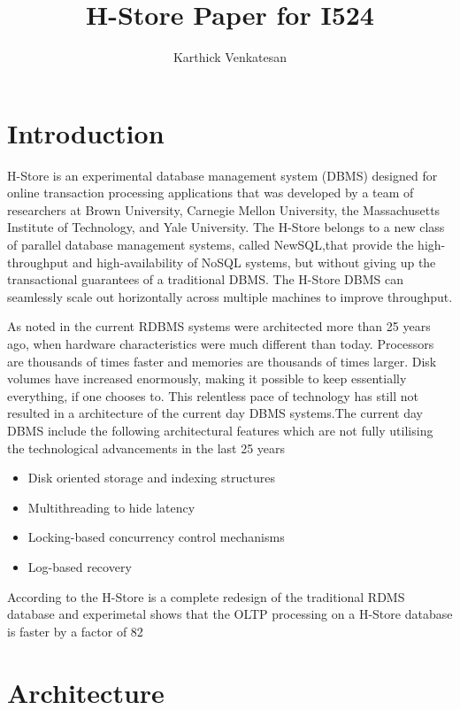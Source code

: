 \documentclass[9pt,twocolumn,twoside]{styles/osajnl}
\title{H-Store Paper for I524}
\author[1]{Karthick Venkatesan}
\affil[1]{School of Informatics and Computing, Bloomington, IN 47408, U.S.A.}
\affil[*]{Corresponding authors: laszewski@gmail.com}
\begin{document}
\maketitle

\section{Introduction}

H-Store is an experimental database management system (DBMS) designed for online transaction processing applications 
that was developed by a team of researchers  at Brown University, Carnegie Mellon University, the Massachusetts Institute of Technology, and Yale University.
The  H-Store belongs to a new class of parallel database management systems, called NewSQL,that provide the high-throughput and high-availability of NoSQL systems, 
but without giving up the transactional guarantees of a traditional DBMS. The H-Store DBMS  can seamlessly scale out horizontally across multiple machines to improve throughput.

As noted in \cite{stonebraker2007} the current RDBMS systems were architected more than 25 years ago, when
hardware characteristics were much different than today.
Processors are thousands of times faster and memories are
thousands of times larger. Disk volumes have increased
enormously, making it possible to keep essentially everything, if
one chooses to. This relentless pace of technology has still not resulted 
in a architecture of the current day DBMS systems.The current day DBMS 
include the following architectural features which are not fully utilising 
the technological advancements in the last 25 years
\begin{itemize}
\renewcommand{\labelitemi}{\scriptsize$\square$} 
\item Disk oriented storage and indexing structures
\item Multithreading to hide latency
\item Locking-based concurrency control mechanisms
\item Log-based recovery
\end{itemize}

According to \cite{stonebraker2007} the H-Store is a complete redesign of the traditional RDMS database and 
experimetal shows that the OLTP processing on a H-Store database is faster 
by a factor of 82  

\section{Architecture}
\end{document}

